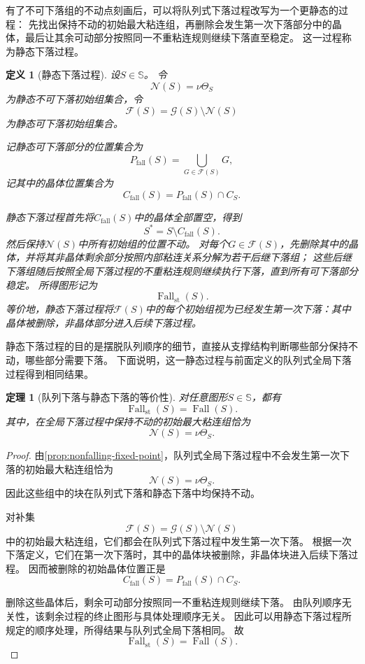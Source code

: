 \documentclass[UTF8,fontset=none]{ctexart}
\theoremstyle{cnthm}
\newtheorem{definition}{定义}[section]
\newtheorem{theorem}{定理}[section]
\begin{document}
			有了不可下落组的不动点刻画后，可以将队列式下落过程改写为一个更静态的过程：
			先找出保持不动的初始最大粘连组，再删除会发生第一次下落部分中的晶体，最后让其余可动部分按照同一不重粘连规则继续下落直至稳定。
			这一过程称为静态下落过程。
			
			\begin{definition}[静态下落过程]
				设$S\in\mathbb{S}$。
				令
				$$
				\mathcal{N}(S)=\nu\Theta_S
				$$
				为静态不可下落初始组集合，令
				$$
				\mathcal{F}(S)=\mathcal{G}(S)\setminus\mathcal{N}(S)
				$$
				为静态可下落初始组集合。
				
				记静态可下落部分的位置集合为
				$$
				P_{\mathrm{fall}}(S)
				=
				\bigcup_{G\in\mathcal{F}(S)}G,
				$$
				记其中的晶体位置集合为
				$$
				C_{\mathrm{fall}}(S)
				=
				P_{\mathrm{fall}}(S)\cap C_S.
				$$
				
				静态下落过程首先将$C_{\mathrm{fall}}(S)$中的晶体全部置空，得到
				$$
				S^{\ast}=S\setminus C_{\mathrm{fall}}(S).
				$$
				然后保持$\mathcal{N}(S)$中所有初始组的位置不动。
				对每个$G\in\mathcal{F}(S)$，先删除其中的晶体，并将其非晶体剩余部分按照内部粘连关系分解为若干后继下落组；
				这些后继下落组随后按照全局下落过程的不重粘连规则继续执行下落，直到所有可下落部分稳定。
				所得图形记为
				$$
				\operatorname{Fall}_{\mathrm{st}}(S).
				$$
				等价地，静态下落过程将$\mathcal{F}(S)$中的每个初始组视为已经发生第一次下落：其中晶体被删除，非晶体部分进入后续下落过程。
			\end{definition}
			
			静态下落过程的目的是摆脱队列顺序的细节，直接从支撑结构判断哪些部分保持不动，哪些部分需要下落。
			下面说明，这一静态过程与前面定义的队列式全局下落过程得到相同结果。
			
			\begin{theorem}[队列下落与静态下落的等价性]
				对任意图形$S\in\mathbb{S}$，都有
				$$
				\operatorname{Fall}_{\mathrm{st}}(S)
				=
				\operatorname{Fall}(S).
				$$
				其中，在全局下落过程中保持不动的初始最大粘连组恰为
				$$
				\mathcal{N}(S)=\nu\Theta_S.
				$$
			\end{theorem}
			
			\begin{proof}
				由\cref{prop:nonfalling-fixed-point}，队列式全局下落过程中不会发生第一次下落的初始最大粘连组恰为
				$$
				\mathcal{N}(S)=\nu\Theta_S.
				$$
				因此这些组中的块在队列式下落和静态下落中均保持不动。
				
				对补集
				$$
				\mathcal{F}(S)=\mathcal{G}(S)\setminus\mathcal{N}(S)
				$$
				中的初始最大粘连组，它们都会在队列式下落过程中发生第一次下落。
				根据一次下落定义，它们在第一次下落时，其中的晶体块被删除，非晶体块进入后续下落过程。
				因而被删除的初始晶体位置正是
				$$
				C_{\mathrm{fall}}(S)=P_{\mathrm{fall}}(S)\cap C_S.
				$$
				
				删除这些晶体后，剩余可动部分按照同一不重粘连规则继续下落。
				由队列顺序无关性，该剩余过程的终止图形与具体处理顺序无关。
				因此可以用静态下落过程所规定的顺序处理，所得结果与队列式全局下落相同。
				故
				$$
				\operatorname{Fall}_{\mathrm{st}}(S)
				=
				\operatorname{Fall}(S).
				$$
			\end{proof}
			
\end{document}
